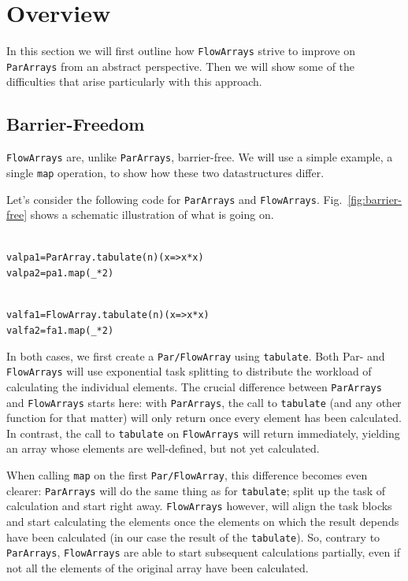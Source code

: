 \documentclass[runningheads,a4paper,fleqn]{llncs}
\begin{document}
\section{Overview}
\label{sec:overview}

In this section we will first outline how \texttt{FlowArrays} strive to improve
on \texttt{ParArrays} from an abstract perspective. Then we will show some of
the difficulties that arise particularly with this approach.

\subsection{Barrier-Freedom}
\texttt{FlowArrays} are, unlike \texttt{ParArrays}, barrier-free. We will use a simple
example, a single \texttt{map} operation, to show how these two
datastructures differ.

Let's consider the following code for \texttt{ParArrays} and
\texttt{FlowArrays}. Fig.~\ref{fig:barrier-free} shows a schematic
illustration of what is going on.

\noindent
\begin{minipage}[t]{.5\textwidth}
\begin{alltt}
{\scriptsize
val pa1 = ParArray.tabulate(n)(x => x*x)
val pa2 = pa1.map(_ * 2)
}
\end{alltt}
\end{minipage}
\begin{minipage}[t]{.5\textwidth}
\begin{alltt}
{\scriptsize
val fa1 = FlowArray.tabulate(n)(x => x*x)
val fa2 = fa1.map(_ * 2)
}
\end{alltt}
\end{minipage}

In both cases, we first create a \texttt{Par/FlowArray} using
\texttt{tabulate}. Both Par- and \texttt{FlowArrays} will use exponential task
splitting \cite{collect11,cong08} to distribute the workload of
calculating the individual elements. The crucial difference between
\texttt{ParArrays} and \texttt{FlowArrays} starts here: with \texttt{ParArrays}, the call to
\texttt{tabulate} (and any other function for that matter) will only
return once every element has been calculated. In contrast, the call
to \texttt{tabulate} on \texttt{FlowArrays} will return immediately, yielding
an array whose elements are well-defined, but not yet calculated.

When calling \texttt{map} on the first \texttt{Par/FlowArray}, this difference
becomes even clearer: \texttt{ParArrays} will do the same thing as for
\texttt{tabulate}; split up the task of calculation and start right
away. \texttt{FlowArrays} however, will align the task blocks and start
calculating the elements once the elements on which the result depends have
been calculated (in our case the result of the \texttt{tabulate}). So,
contrary to \texttt{ParArrays}, \texttt{FlowArrays} are able to start subsequent
calculations partially, even if not all the elements of the original
array have been calculated.
\end{document}

